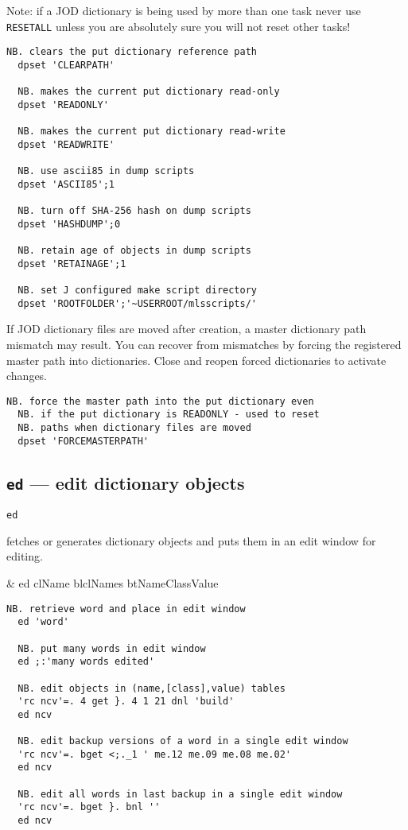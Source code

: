 Note: if a JOD dictionary is being used 
by more than one task never use \texttt{RESETALL} unless 
you are absolutely sure you will not reset other tasks!

\begin{lstlisting}[frame=single,framerule=0pt]
  NB. clears the put dictionary reference path
  dpset 'CLEARPATH'  
  
  NB. makes the current put dictionary read-only 
  dpset 'READONLY'    
  
  NB. makes the current put dictionary read-write
  dpset 'READWRITE'   
  
  NB. use ascii85 in dump scripts 
  dpset 'ASCII85';1  

  NB. turn off SHA-256 hash on dump scripts
  dpset 'HASHDUMP';0
  
  NB. retain age of objects in dump scripts
  dpset 'RETAINAGE';1
  
  NB. set J configured make script directory
  dpset 'ROOTFOLDER';'~USERROOT/mlsscripts/' 
\end{lstlisting}

If JOD dictionary files are moved after creation, a master
dictionary path mismatch may result. You can recover from
mismatches by forcing the registered master path into 
dictionaries. Close and reopen forced dictionaries to activate changes.
 
\begin{lstlisting}[frame=single,framerule=0pt]
  NB. force the master path into the put dictionary even
  NB. if the put dictionary is READONLY - used to reset
  NB. paths when dictionary files are moved
  dpset 'FORCEMASTERPATH'
\end{lstlisting}


\subsection{\texttt{ed} --- edit dictionary objects}\label{ss:ed}

\hypertarget{il:ed}{\texttt{ed}} fetches or generates dictionary objects and puts 
them in an edit window for editing.

\begin{wordhead}
\monad & ed clName \argsep blclNames \argsep btNameClassValue \\
\end{wordhead}
\begin{lstlisting}[frame=single,framerule=0pt]
  NB. retrieve word and place in edit window
  ed 'word'
  
  NB. put many words in edit window 
  ed ;:'many words edited' 
  
  NB. edit objects in (name,[class],value) tables
  'rc ncv'=. 4 get }. 4 1 21 dnl 'build'
  ed ncv
  
  NB. edit backup versions of a word in a single edit window
  'rc ncv'=. bget <;._1 ' me.12 me.09 me.08 me.02'
  ed ncv
  
  NB. edit all words in last backup in a single edit window
  'rc ncv'=. bget }. bnl ''
  ed ncv
\end{lstlisting} 


